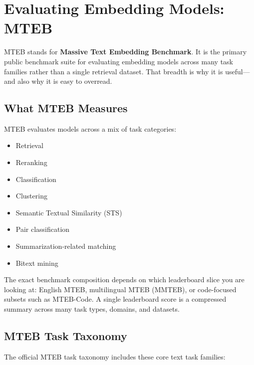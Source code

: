 \chapter{Evaluating Embedding Models: MTEB}
\label{ch:mteb}

MTEB stands for \textbf{Massive Text Embedding Benchmark}. It is the primary public benchmark
suite for evaluating embedding models across many task families rather than a single retrieval
dataset. That breadth is why it is useful---and also why it is easy to overread.

\section{What MTEB Measures}

MTEB evaluates models across a mix of task categories:

\begin{itemize}
    \item Retrieval
    \item Reranking
    \item Classification
    \item Clustering
    \item Semantic Textual Similarity (STS)
    \item Pair classification
    \item Summarization-related matching
    \item Bitext mining
\end{itemize}

The exact benchmark composition depends on which leaderboard slice you are looking at:
English MTEB, multilingual MTEB (MMTEB), or code-focused subsets such as MTEB-Code. A single
leaderboard score is a compressed summary across many task types, domains, and datasets.

\section{MTEB Task Taxonomy}

The official MTEB task taxonomy includes these core text task families:

